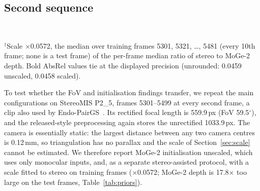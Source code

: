 
\subsection{Second sequence}
\label{sec:p25}
\begin{table}[t]
\caption{Second sequence: StereoMIS P2\_5, frames 5301--5499 (every second frame; 100 frames, 13 test views; mean $\pm$ sample s.d., 3 seeds). The camera is static, so the known-pose scale is undefined; the scaled row uses a separate, stereo-assisted protocol. AbsRel: per-frame scale-aligned, against stereo.}
\label{tab:p25}
\centering
{}\\[2pt]
\parbox{\columnwidth}{\raggedright\scriptsize $^\dagger$Scale $\times$0.0572, the median over training frames 5301, 5321, \dots, 5481 (every 10th frame; none is a test frame) of the per-frame median ratio of stereo to MoGe-2 depth. Bold AbsRel values tie at the displayed precision (unrounded: 0.0459 unscaled, 0.0458 scaled).}
\end{table}
To test whether the FoV and initialisation findings transfer, we repeat the main configurations on StereoMIS P2\_5, frames 5301--5499 at every second frame, a clip also used by Endo-PairGS~\cite{yu2026endopairgs}. Its rectified focal length is 559.9\,px (FoV 59.5$^\circ$), and the released-style preprocessing again stores the unrectified 1033.9\,px. The camera is essentially static: the largest distance between any two camera centres is 0.12\,mm, so triangulation has no parallax and the scale of Section~\ref{sec:scale} cannot be estimated. We therefore report MoGe-2 initialisation unscaled, which uses only monocular inputs, and, as a separate stereo-assisted protocol, with a scale fitted to stereo on training frames ($\times$0.0572; MoGe-2 depth is 17.8$\times$ too large on the test frames, Table~\ref{tab:priors}).

